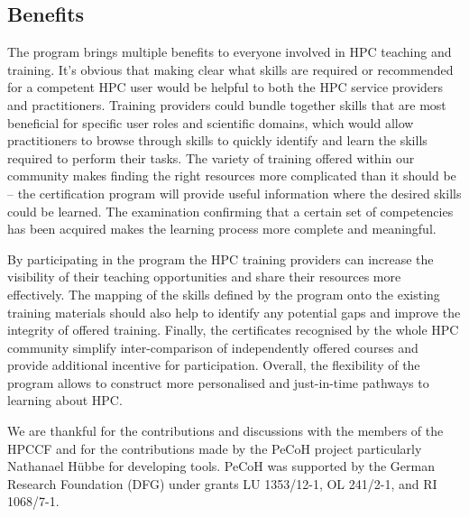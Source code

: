 \documentclass[jocse]{jocseart}
\begin{document}
\subsection{Benefits}

The program brings multiple benefits to everyone involved in HPC teaching and training. It's obvious that making clear what skills are required or recommended for a competent HPC user would be helpful to both the HPC service providers and practitioners. Training providers could bundle together skills that are most beneficial for specific user roles and scientific domains, which would allow practitioners to browse through skills to quickly identify and learn the skills required to perform their tasks. The variety of training offered within our community makes finding the right resources more complicated than it should be -- the certification program will provide useful information where the desired skills could be learned. The examination confirming that a certain set of competencies has been acquired makes the learning process more complete and meaningful.

By participating in the program the HPC training providers can increase the visibility of their teaching opportunities and share their resources more effectively.
The mapping of the skills defined by the program onto the existing training materials should also help to identify any potential gaps and improve the integrity of offered training.
Finally, the certificates recognised by the whole HPC community simplify inter-comparison of independently offered courses and provide additional incentive for participation.
Overall, the flexibility of the program allows to construct more personalised and just-in-time pathways to learning about HPC.


\appendix

\begin{acks}
\small
We are thankful for the contributions and discussions with the members of the HPCCF and for the contributions made by the PeCoH project particularly Nathanael Hübbe for developing tools.
PeCoH was supported by the German Research Foundation (DFG) under grants LU 1353/12-1, OL 241/2-1, and RI 1068/7-1.
\end{acks}



\end{document}
